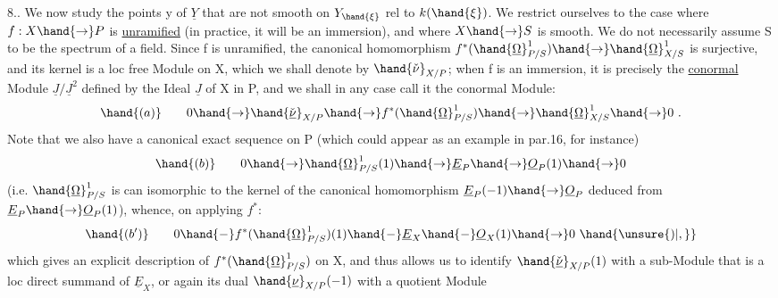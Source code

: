 
8.. We now study the points y of $\underline{Y}$ that are not smooth
on $Y_{\hand{\xi}}$ rel to $k(\hand{\xi})$. We restrict ourselves to the case where $f:X\hand{\to} P$ is \uline{unramified}
(in practice, it will be an immersion), and where $X\hand{\to} S$ is smooth. We do not
necessarily assume S to be the spectrum of a field. 
 Since
f is unramified, the canonical homomorphism $f^*(\hand{\underline{\Omega}}^1_{P/S})\hand{\to}\hand{\underline{\Omega}}^1_{X/S}$
is surjective, and its kernel is a loc free Module on X, which we
shall denote by $\hand{\check{\nu}}_{X/P}$; when f is an immersion, it is precisely the
\uline{conormal} Module $\underline{J}/\underline{J}^2$ defined by the Ideal $\underline{J}$ of X in P, and we shall
in any case call it the conormal Module:
\[ \hand{(a)} \qquad 0\hand{\to}\hand{\check{\underline{\nu}}}_{X/P}\hand{\to} f^*(\hand{\underline{\Omega}}^1_{P/S})\hand{\to}\hand{\underline{\Omega}}^1_{X/S}\hand{\to} 0 \ . \]
Note that we also have a canonical exact sequence on P
(which could appear as an example in par.16, for instance)
\[ \hand{(b)} \qquad 0\hand{\to}\hand{\underline{\Omega}}^1_{P/S}(1)\hand{\to}\underline{E}_P\hand{\to}\underline{O}_P(1)\hand{\to} 0 \]
(i.e. $\hand{\underline{\Omega}}^1_{P/S}$ is can isomorphic to the kernel of the canonical homomorphism
$\underline{E}_P(-1)\hand{\to}\underline{O}_P$ deduced from $\underline{E}_P\hand{\to}\underline{O}_P(1)$), whence, on applying $f^*$:
\[ \hand{(b')} \qquad 0 \hand{-} f^*(\hand{\underline{\Omega}}^1_{P/S})(1) \hand{-} \underline{E}_X \hand{-} \underline{O}_X(1)\hand{\to} 0 \ \hand{\unsure{)|,}} \]
which gives an explicit description of $f^*(\hand{\underline{\Omega}}^1_{P/S})$  on X, and
thus allows us to identify $\hand{\check{\underline{\nu}}}_{X/P}(1)$ with a sub-Module that is a loc direct summand
of $\underline{E}_X$, or again its  dual $\hand{\underline{\nu}}_{X/P}(-1)$ with a quotient Module
